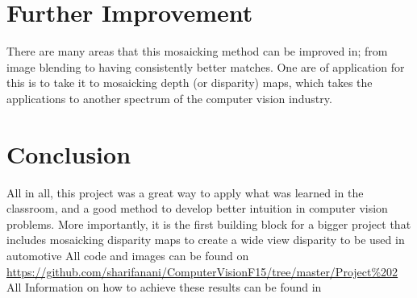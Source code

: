 \documentclass[10pt,twocolumn,letterpaper]{article}
\begin{document}
\section{Further Improvement}
There are many areas that this mosaicking method can be improved in; from image blending to having consistently better matches. One are of application for this is to take it to mosaicking depth (or disparity) maps, which takes the applications to another spectrum of the computer vision industry.
\section{Conclusion}
All in all, this project was a great way to apply what was learned in the classroom, and a good method to develop better intuition in computer vision problems. More importantly, it is the first building block for a bigger project that includes mosaicking disparity maps to create a wide view disparity to be used in automotive 
All code and images can be found on \url{https://github.com/sharifanani/ComputerVisionF15/tree/master/Project%202}
\\
All Information on how to achieve these results can be found in \cite{Szeliski}
%
{\small


}
\end{document}
